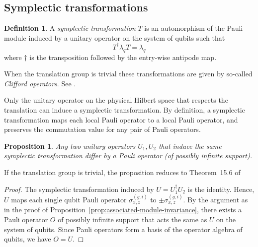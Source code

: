 \documentclass[letterpaper,12pt]{amsart}
\newtheorem{prop}[lem]{Proposition}
\theoremstyle{definition} \newtheorem{defn}{Definition}
\theoremstyle{definition} \newtheorem{rem}{Remark}
\theoremstyle{definition} \newtheorem{example}{Example}
\begin{document}
\subsection{Symplectic transformations}
\label{sec:symplectic-transformations}

\begin{defn}
A {\em symplectic transformation} $T$ is an automorphism of the Pauli module
induced by a unitary operator on the system of qubits
such that 
\[
  T^\dagger \lambda_q T = \lambda_q
\]
where $\dagger$ is the transposition followed by the entry-wise antipode map.
\label{defn:symplectic-transformation}
\end{defn}
When the translation group is trivial these transformations are given by so-called \emph{Clifford operators}.
See \cite[Chapter 15]{KitaevShenVyalyi2002CQC}.

Only the unitary operator on the physical Hilbert space 
that respects the translation can induce a symplectic transformation.
By definition, a symplectic transformation maps each local Pauli operator to a local Pauli operator, and 
preserves the commutation value for any pair of Pauli operators.
\begin{prop}
Any two unitary operators $U_1, U_2$ that induce the same symplectic transformation
differ by a Pauli operator (of possibly infinite support).
\end{prop}
If the translation group is trivial,
the proposition reduces to Theorem~15.6 of \cite{KitaevShenVyalyi2002CQC}
\begin{proof}
The symplectic transformation induced by $U = U_1^\dagger U_2$ is the identity.
Hence, $U$ maps each single qubit Pauli operator $\sigma_{x,z}^{(g,i)}$ to $\pm \sigma_{x,z}^{(g,i)}$.
By the argument as in the proof of Proposition~\ref{prop:associated-module-invariance},
there exists a Pauli operator $O$ of possibly infinite support
that acts the same as $U$ on the system of qubits.
Since Pauli operators form a basis of the operator algebra of qubits,
we have $O=U$.
\end{proof}
\end{document}
